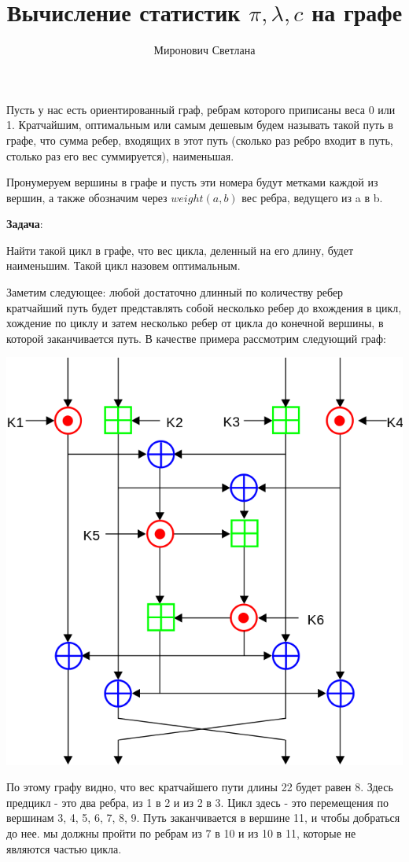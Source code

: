 \documentclass[a4paper,12pt]{article}
\title{Вычисление статистик $\pi, \lambda, c$ на графе}
\date{}
\author{Миронович Светлана}
\begin{document}
  \maketitle

Пусть у нас есть ориентированный граф, ребрам которого приписаны веса 0 или 1. Кратчайшим, оптимальным или самым дешевым будем называть такой путь в графе, что сумма ребер, входящих в этот путь (сколько раз ребро входит в путь, столько раз его вес суммируется), наименьшая.

Пронумеруем вершины в графе и пусть эти номера будут метками каждой из вершин, а также обозначим через $weight(a,b)$ вес ребра, ведущего из a в b. 

\textbf{Задача}:

Найти такой цикл в графе, что вес цикла, деленный на его длину, будет наименьшим. Такой цикл назовем оптимальным.

Заметим следующее: любой достаточно длинный по количеству ребер кратчайший путь будет представлять собой несколько ребер до вхождения в цикл, хождение по циклу и затем несколько ребер от цикла до конечной вершины, в которой заканчивается путь. В качестве примера рассмотрим следующий граф:

\includegraphics[width=\textwidth]{1}

По этому графу видно, что вес кратчайшего пути длины 22 будет равен 8. Здесь предцикл - это два ребра, из 1 в 2 и из 2 в 3. Цикл здесь - это перемещения по вершинам 3, 4, 5, 6, 7, 8, 9. Путь заканчивается в вершине 11, и чтобы добраться до нее. мы должны пройти по ребрам из 7 в 10 и из 10 в 11, которые не являются частью цикла.
\end{document}
